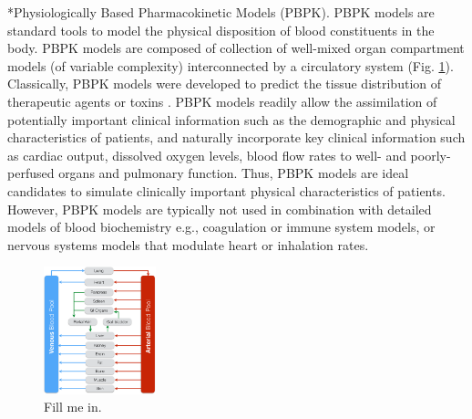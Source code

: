 \documentclass[12pt]{article}
\makeatletter
\renewcommand\subsection{\@startsection
	{subsection}{2}{0mm}
	{-0.05in}
	{-0.5\baselineskip}
	{\normalfont\normalsize\bfseries}}
\makeatother
\begin{document}
\subsection*{Physiologically Based Pharmacokinetic Models (PBPK).}
PBPK models are standard tools to model the physical disposition of blood constituents in the body.
PBPK models are composed of collection of well-mixed organ compartment models (of variable complexity) interconnected by a circulatory system (Fig. \ref{fig:SamplePBPK}).
Classically, PBPK models were developed to predict the tissue distribution of therapeutic agents or toxins \cite{Gerlowski:1983aa}.
PBPK models readily allow the assimilation of potentially important clinical information such as the demographic and physical characteristics of patients,
and naturally incorporate key clinical information such as cardiac output,
dissolved oxygen levels, blood flow rates to well- and poorly-perfused organs and pulmonary function.
Thus, PBPK models are ideal candidates to simulate clinically important physical characteristics of patients.
However, PBPK models are typically not used in combination with detailed models of blood biochemistry e.g., coagulation or immune system models, or nervous systems models that modulate heart or inhalation rates.


\begin{figure}
  \includegraphics[width=0.29\textwidth]{./figs/PBPK-Figure-7-31-14.pdf}
  \caption{Fill me in.}\label{fig:SamplePBPK}
\end{figure}
\end{document}
